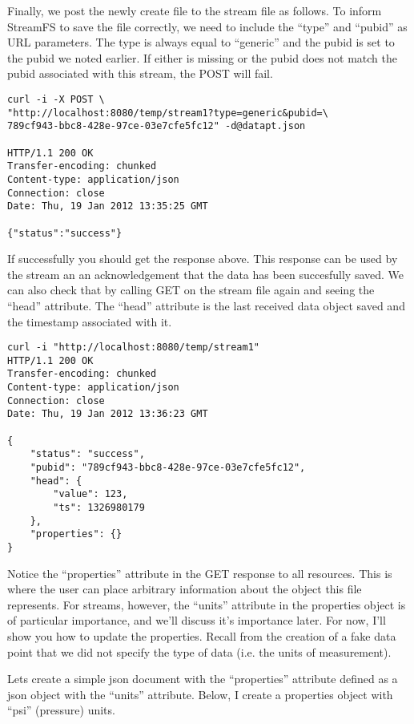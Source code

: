 Finally, we post the newly create file to the stream file as follows. To inform StreamFS to save the file correctly, we need to include the ``type'' and ``pubid'' as URL parameters. The type is always equal to ``generic'' and the pubid is set to the pubid we noted earlier. If either is missing or the pubid does not match the pubid associated with this stream, the POST will fail.

\begin{lstlisting}
curl -i -X POST \
"http://localhost:8080/temp/stream1?type=generic&pubid=\
789cf943-bbc8-428e-97ce-03e7cfe5fc12" -d@datapt.json

HTTP/1.1 200 OK
Transfer-encoding: chunked
Content-type: application/json
Connection: close
Date: Thu, 19 Jan 2012 13:35:25 GMT

{"status":"success"}
\end{lstlisting}

If successfully you should get the response above. This response can be used by the stream an an acknowledgement that the data has been succesfully saved. We can also check that by calling GET on the stream file again and seeing the ``head'' attribute. The ``head'' attribute is the last received data object saved and the timestamp associated with it.

\begin{lstlisting}
curl -i "http://localhost:8080/temp/stream1"
HTTP/1.1 200 OK
Transfer-encoding: chunked
Content-type: application/json
Connection: close
Date: Thu, 19 Jan 2012 13:36:23 GMT

{
    "status": "success",
    "pubid": "789cf943-bbc8-428e-97ce-03e7cfe5fc12",
    "head": {
        "value": 123,
        "ts": 1326980179
    },
    "properties": {}
}
\end{lstlisting}

Notice the ``properties'' attribute in the GET response to all resources. This is where the user can place arbitrary information about the object this file represents. For streams, however, the ``units'' attribute in the properties object is of particular importance, and we'll discuss it's importance later. For now, I'll show you how to update the properties. Recall from the creation of a fake data point that we did not specify the type of data (i.e. the units of measurement).

Lets create a simple json document with the ``properties'' attribute defined as a json object with the ``units'' attribute. Below, I create a properties object with ``psi'' (pressure) units.

